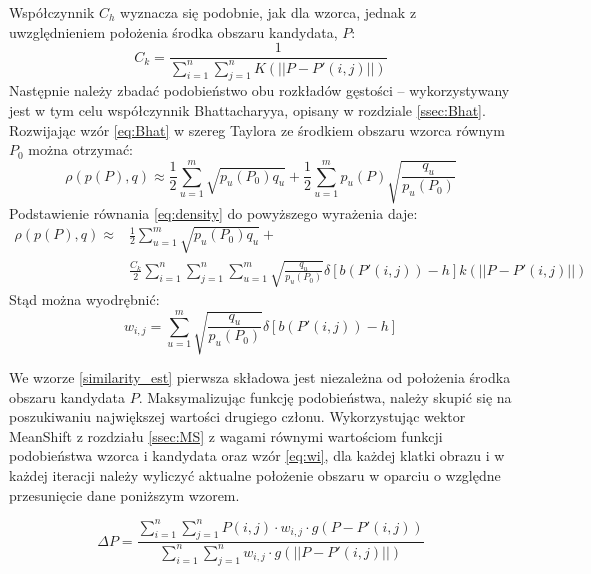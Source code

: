 Współczynnik $C_h$ wyznacza się podobnie, jak dla wzorca, jednak z uwzględnieniem położenia środka obszaru kandydata, $P$:
\begin{equation}
C_k=\frac{1}{\sum_{i=1}^{n}\sum_{j=1}^{n}K(||P-P'(i,j)||)} 
\end{equation}
Następnie należy zbadać podobieństwo obu rozkładów gęstości -- wykorzystywany jest w tym celu współczynnik Bhattacharyya, opisany w rozdziale \ref{ssec:Bhat}. Rozwijając wzór \eqref{eq:Bhat} w szereg Taylora ze środkiem obszaru wzorca równym $P_0$ można otrzymać:
\begin{equation}
\label{eq:approx}
\rho(p(P),q)\approx\frac{1}{2}\sum_{u=1}^{m}\sqrt{p_u(P_0)q_u} + \frac{1}{2}\sum_{u=1}^{m}p_u(P)\sqrt{\frac{q_u}{p_u(P_0)}}
\end{equation}
Podstawienie równania \eqref{eq:density} do powyższego wyrażenia daje:
\begin{equation}
\label{similarity_est}
\begin{aligned}
\rho(p(P),q)\approx & \frac{1}{2}\sum_{u=1}^{m}\sqrt{p_u(P_0)q_u} + \\ & \frac{C_k}{2}\sum_{i=1}^{n}\sum_{j=1}^{n}\sum_{u=1}^{m}\sqrt{\frac{q_u}{p_u(P_0)}}\delta[b(P'(i,j))-h] k(||P-P'(i,j)||)
\end{aligned}
\end{equation}
Stąd można wyodrębnić:
\begin{equation}
\label{eq:wi}
w_{i,j}=\sum_{u=1}^{m}\sqrt{\frac{q_u}{p_u(P_0)}}\delta[b(P'(i,j))-h]
\end{equation}


We wzorze \eqref{similarity_est} pierwsza składowa jest niezależna od położenia środka obszaru kandydata $P$. 
Maksymalizując funkcję podobieństwa, należy skupić się na poszukiwaniu największej wartości drugiego członu. 
Wykorzystując wektor MeanShift z rozdziału \ref{ssec:MS} z wagami równymi wartościom funkcji podobieństwa wzorca i kandydata oraz wzór \eqref{eq:wi}, dla każdej klatki obrazu i w każdej iteracji należy wyliczyć aktualne położenie obszaru w oparciu o względne przesunięcie dane poniższym wzorem.

\begin{equation}
\label{eq:position}
\Delta P=\frac{\sum_{i=1}^{n}\sum_{j=1}^{n}P(i,j)\cdot w_{i,j}\cdot g(P-P'(i,j))}{\sum_{i=1}^{n}\sum_{j=1}^{n}w_{i,j}\cdot g(||P-P'(i,j)||)}
\end{equation}

